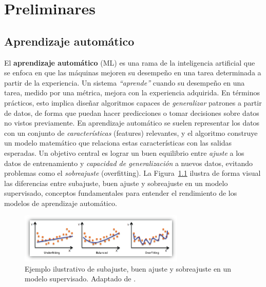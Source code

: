 \documentclass[11pt,spanish,listoffigures,listoftables]{tfgetsinf}
\begin{document}

\chapter{Preliminares}  %
\section{Aprendizaje automático}


El \textbf{aprendizaje automático} (ML) es una rama de la inteligencia artificial que se enfoca en que las máquinas mejoren 
su desempeño en una tarea determinada a partir de la experiencia. Un sistema \textit{“aprende”} cuando su desempeño en una tarea, 
medido por una métrica, mejora con la experiencia adquirida. En términos prácticos, esto implica diseñar algoritmos capaces de 
\textit{generalizar} patrones a partir de datos, de forma que puedan hacer predicciones o tomar decisiones sobre datos no vistos 
previamente. En aprendizaje automático se suelen representar los datos con un conjunto de \textit{características} (features) relevantes, y el algoritmo 
construye un modelo matemático que relaciona estas características con las salidas esperadas. Un objetivo central es lograr un buen 
equilibrio entre \textit{ajuste} a los datos de entrenamiento y \textit{capacidad de generalización} a nuevos datos, evitando problemas 
como el \textit{sobreajuste} (overfitting). La Figura~\ref{fig:overfitting} ilustra de forma visual las diferencias entre 
subajuste, buen ajuste y sobreajuste en un modelo supervisado, conceptos fundamentales para entender el rendimiento de los modelos de aprendizaje automático.

\begin{figure}[ht]
    \centering
    \includegraphics[width=0.7\textwidth]{under-overfitting.png}
    \caption{Ejemplo ilustrativo de subajuste, buen ajuste y sobreajuste en un modelo supervisado. Adaptado de \cite{awsOverfitting}.}
    \label{fig:overfitting}
\end{figure}
\end{document}
